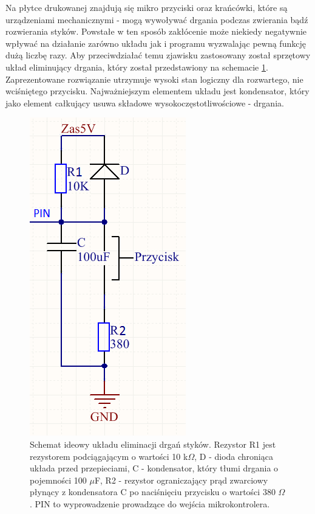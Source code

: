   Na płytce drukowanej znajdują się mikro przyciski oraz krańcówki, które są urządzeniami mechanicznymi - mogą wywoływać drgania podczas zwierania bądź rozwierania styków. Powstałe w ten sposób zakłócenie może niekiedy negatywnie wpływać na działanie zarówno układu jak i programu wyzwalając pewną funkcję dużą liczbę razy. Aby przeciwdziałać temu zjawisku zastosowany został sprzętowy układ eliminujący drgania, który został przedstawiony na schemacie \ref{drg}. Zaprezentowane rozwiązanie utrzymuje wysoki stan logiczny dla rozwartego, nie wciśniętego przycisku. Najważniejszym elementem układu jest kondensator, który jako element całkujący usuwa składowe wysokoczęstotliwościowe - drgania. 
  \newpage
 \begin{figure}[H]
    \begin{center}
      \includegraphics[scale=0.45]{imgs/drgania.png}
 	\caption[Eliminacja drgań styków.]{\small{Schemat ideowy układu eliminacji drgań styków. Rezystor R1 jest rezystorem podciągającym o wartości 10 k$\Omega$, D - dioda chroniąca układa przed przepieciami, C - kondensator, który tłumi drgania o pojemności 100 $\mu$F, R2 - rezystor ograniczający prąd zwarciowy płynący z kondensatora C po naciśnięciu przycisku o wartości 380 $\Omega$. PIN to wyprowadzenie prowadzące do wejścia mikrokontrolera. }}
	\label{drg}
    \end{center}
  \end{figure}   
  
